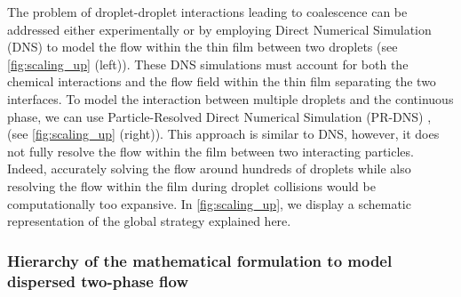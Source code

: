 The problem of droplet-droplet interactions leading to coalescence can be addressed either experimentally or by employing Direct Numerical Simulation (DNS) to model the flow within the thin film between two droplets (see \ref{fig:scaling_up} (left)).
These DNS simulations must account for both the chemical interactions and the flow field within the thin film separating the two interfaces.
To model the interaction between multiple droplets and the continuous phase, we can use Particle-Resolved Direct Numerical Simulation (PR-DNS) \citep{tryggvason2006direct}, (see \ref{fig:scaling_up} (right)).
This approach is similar to DNS, however, it does not fully resolve the flow within the film between two interacting particles.
Indeed, accurately solving the flow around hundreds of droplets while also resolving the flow within the film during droplet collisions would be computationally too expansive.
In \ref{fig:scaling_up}, we display a schematic representation of the global strategy explained here.




\subsubsection{Hierarchy of the mathematical formulation to model dispersed two-phase flow}

